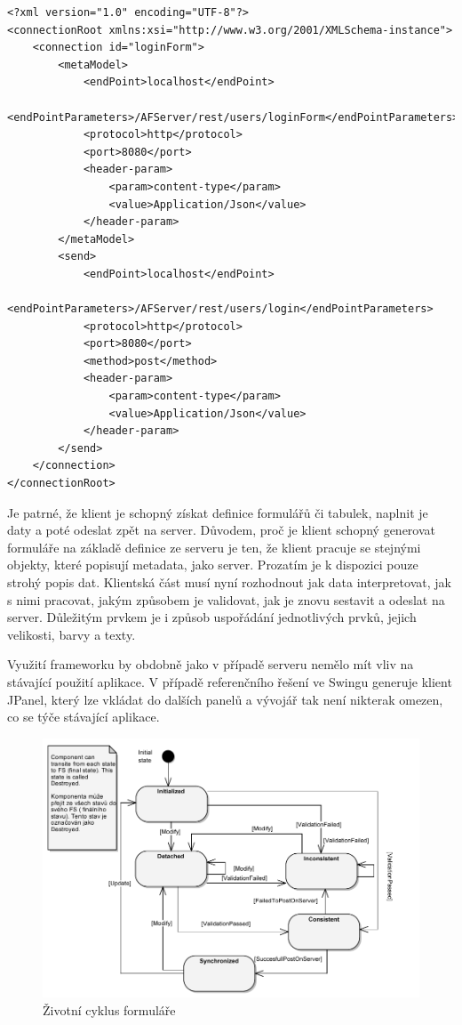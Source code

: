 \begin{lstlisting}[caption=Ukázka XML specifikace zdrojů,
label={code:xmlSource}, basicstyle=\footnotesize]
<?xml version="1.0" encoding="UTF-8"?>
<connectionRoot xmlns:xsi="http://www.w3.org/2001/XMLSchema-instance">
	<connection id="loginForm">
		<metaModel>
			<endPoint>localhost</endPoint>
			<endPointParameters>/AFServer/rest/users/loginForm</endPointParameters>
			<protocol>http</protocol>
			<port>8080</port>
			<header-param>
				<param>content-type</param>
				<value>Application/Json</value>
			</header-param>
		</metaModel>
		<send>
			<endPoint>localhost</endPoint>
			<endPointParameters>/AFServer/rest/users/login</endPointParameters>
			<protocol>http</protocol>
			<port>8080</port>
			<method>post</method>
			<header-param>
				<param>content-type</param>
				<value>Application/Json</value>
			</header-param>
		</send>
	</connection>
</connectionRoot>
\end{lstlisting}

Je patrné, že klient je schopný získat definice formulářů či tabulek, naplnit je daty a poté odeslat zpět na server. Důvodem, proč je klient schopný generovat formuláře na základě definice ze serveru je ten, že klient pracuje se stejnými objekty, které popisují metadata, jako server. Prozatím je k dispozici pouze strohý popis dat. Klientská část musí nyní rozhodnout jak data interpretovat, jak s nimi pracovat, jakým způsobem je validovat, jak je znovu sestavit a odeslat na server. Důležitým prvkem je i způsob uspořádání jednotlivých prvků, jejich velikosti, barvy a texty.

Využití frameworku by obdobně jako v případě serveru nemělo mít vliv na stávající použití aplikace. V případě referenčního řešení ve Swingu generuje klient JPanel, který lze vkládat do dalších panelů a vývojář tak není nikterak omezen, co se týče stávající aplikace. 

\begin{figure}[h!]
\includegraphics{images/formLifecCycle}
\caption{Životní cyklus formuláře}
\label{img:formLifeCycle}
\end{figure}

